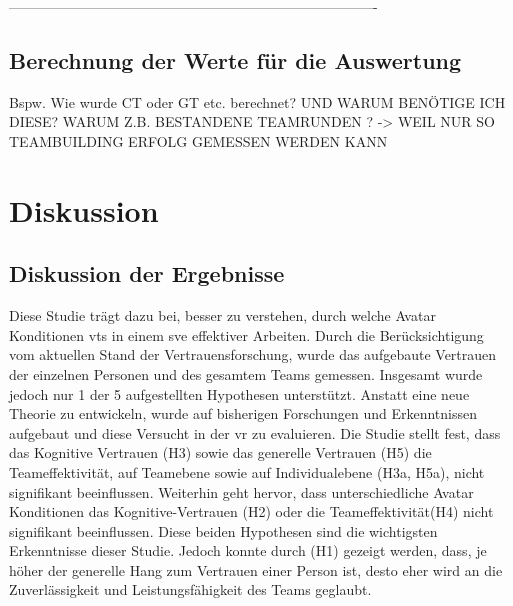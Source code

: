\documentclass[a4paper,11pt]{article}%
\renewcommand{\\}{\vspace*{0.5\baselineskip} \newline}
\begin{document}
-------------------------------------------------------------------------------



\subsection{Berechnung der Werte für die Auswertung}
Bspw. Wie wurde CT oder GT etc. berechnet? UND WARUM BENÖTIGE ICH DIESE? WARUM Z.B. BESTANDENE TEAMRUNDEN ? -> WEIL NUR SO TEAMBUILDING ERFOLG GEMESSEN WERDEN KANN
\newpage

\clearpage
\newpage

\section{Diskussion}
	\subsection{Diskussion der Ergebnisse}
	Diese Studie trägt dazu bei, besser zu verstehen, durch welche Avatar Konditionen \ac{vts} in einem \ac{sve} effektiver Arbeiten. Durch die Berücksichtigung vom aktuellen Stand der Vertrauensforschung, wurde das aufgebaute Vertrauen der einzelnen Personen und des gesamtem Teams gemessen. Insgesamt wurde jedoch nur 1 der 5 aufgestellten Hypothesen unterstützt. 
Anstatt eine neue Theorie zu entwickeln, wurde auf bisherigen Forschungen und Erkenntnissen aufgebaut und diese Versucht in der \ac{vr} zu evaluieren.
Die Studie stellt fest, dass das Kognitive Vertrauen (H3) sowie das generelle Vertrauen (H5) die Teameffektivität, auf Teamebene sowie auf Individualebene (H3a, H5a), nicht signifikant beeinflussen. 
Weiterhin geht hervor, dass unterschiedliche Avatar Konditionen das Kognitive-Vertrauen (H2) oder die Teameffektivität(H4) nicht signifikant beeinflussen. Diese beiden Hypothesen sind die wichtigsten Erkenntnisse dieser Studie.
Jedoch konnte durch (H1) gezeigt werden, dass, je höher der generelle Hang zum Vertrauen einer Person ist, desto eher wird an die Zuverlässigkeit und Leistungsfähigkeit des Teams geglaubt.
\end{document}
